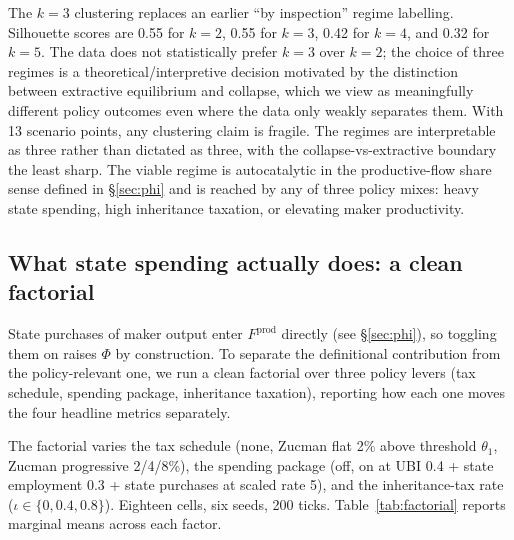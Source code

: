 \documentclass[11pt]{article}
\begin{document}
The $k=3$ clustering replaces an earlier ``by inspection'' regime
labelling. Silhouette scores are 0.55 for $k=2$, 0.55 for $k=3$,
0.42 for $k=4$, and 0.32 for $k=5$. The data does not statistically
prefer $k=3$ over $k=2$; the choice of three regimes is a
theoretical/interpretive decision motivated by the distinction
between extractive equilibrium and collapse, which we view as
meaningfully different policy outcomes even where the data only
weakly separates them. With 13 scenario points, any clustering
claim is fragile. The regimes are interpretable as three rather
than dictated as three, with the collapse-vs-extractive boundary
the least sharp. The viable regime is autocatalytic in the
productive-flow share sense defined in \S\ref{sec:phi} and is
reached by any of three policy mixes: heavy state spending, high
inheritance taxation, or elevating maker productivity.

\subsection{What state spending actually does: a clean factorial}
\label{sec:state-spending}

State purchases of maker output enter $F^\text{prod}$
directly (see \S\ref{sec:phi}), so toggling them on raises $\Phi$
by construction. To separate the definitional contribution from
the policy-relevant one, we run a clean factorial over three policy
levers (tax schedule, spending package, inheritance taxation),
reporting how each one moves the four headline metrics separately.

The factorial varies the tax schedule (none, Zucman flat 2\% above
threshold $\theta_1$, Zucman progressive 2/4/8\%), the spending
package (off, on at UBI 0.4 + state employment 0.3 + state purchases
at scaled rate 5), and the inheritance-tax rate ($\iota \in \{0,
0.4, 0.8\}$). Eighteen cells, six seeds, 200 ticks.
Table~\ref{tab:factorial} reports marginal means across each
factor.
\end{document}
